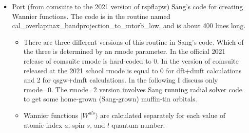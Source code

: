 \documentclass[aps,prb,singlecolumn,preprintnumbers,amsmath,amssymb]{revtex4}
\begin{document}
\begin{itemize}
\item Port (from comsuite to the 2021 version of rspflapw)  Sang's code for creating Wannier functions.  The code is in the routine named cal\_overlapmax\_bandprojection\_to\_mtorb\_low, and is about 400 lines long.
\begin{itemize}
\item There are three different versions of this routine in Sang's code.  Which of the three is determined by an rmode parameter.  In the official 2021 release of comsuite rmode is hard-coded to 0.  In the version of comsuite released at the 2021 school rmode is equal to 0 for dft+dmft calculations and 2 for qsgw+dmft calculations.  In the following I discuss only rmode=0.  The rmode=2 version involves Sang running radial solver code to get some home-grown (Sang-grown) muffin-tin orbitals.
\item Wannier functions $ | W^{als} \rangle $ are calculated separately for each value of atomic index $a$, spin $s$, and $l$ quantum number.




 



\end{itemize}
\end{itemize}
\end{document}
